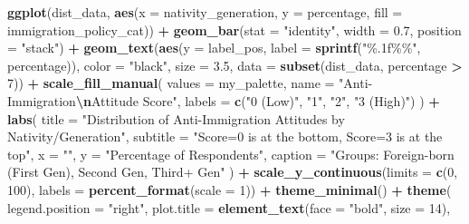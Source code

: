 \documentclass[
]{article}
\newenvironment{Shaded}{\begin{snugshade}}{\end{snugshade}}
\newcommand{\AttributeTok}[1]{\textcolor[rgb]{0.13,0.29,0.53}{#1}}
\newcommand{\DecValTok}[1]{\textcolor[rgb]{0.00,0.00,0.81}{#1}}
\newcommand{\FloatTok}[1]{\textcolor[rgb]{0.00,0.00,0.81}{#1}}
\newcommand{\FunctionTok}[1]{\textcolor[rgb]{0.13,0.29,0.53}{\textbf{#1}}}
\newcommand{\NormalTok}[1]{#1}
\newcommand{\SpecialCharTok}[1]{\textcolor[rgb]{0.81,0.36,0.00}{\textbf{#1}}}
\newcommand{\StringTok}[1]{\textcolor[rgb]{0.31,0.60,0.02}{#1}}
\begin{document}
\begin{Shaded}
\begin{Highlighting}[]
\FunctionTok{ggplot}\NormalTok{(dist\_data, }\FunctionTok{aes}\NormalTok{(}\AttributeTok{x =}\NormalTok{ nativity\_generation, }\AttributeTok{y =}\NormalTok{ percentage, }\AttributeTok{fill =}\NormalTok{ immigration\_policy\_cat)) }\SpecialCharTok{+}
  \FunctionTok{geom\_bar}\NormalTok{(}\AttributeTok{stat =} \StringTok{"identity"}\NormalTok{, }\AttributeTok{width =} \FloatTok{0.7}\NormalTok{, }\AttributeTok{position =} \StringTok{"stack"}\NormalTok{) }\SpecialCharTok{+}
  \FunctionTok{geom\_text}\NormalTok{(}\FunctionTok{aes}\NormalTok{(}\AttributeTok{y =}\NormalTok{ label\_pos, }\AttributeTok{label =} \FunctionTok{sprintf}\NormalTok{(}\StringTok{"\%.1f\%\%"}\NormalTok{, percentage)),}
            \AttributeTok{color =} \StringTok{"black"}\NormalTok{, }\AttributeTok{size =} \FloatTok{3.5}\NormalTok{,}
            \AttributeTok{data =} \FunctionTok{subset}\NormalTok{(dist\_data, percentage }\SpecialCharTok{\textgreater{}} \DecValTok{7}\NormalTok{)) }\SpecialCharTok{+}
  \FunctionTok{scale\_fill\_manual}\NormalTok{(}
    \AttributeTok{values =}\NormalTok{ my\_palette,}
    \AttributeTok{name =} \StringTok{"Anti{-}Immigration}\SpecialCharTok{\textbackslash{}n}\StringTok{Attitude Score"}\NormalTok{,}
    \AttributeTok{labels =} \FunctionTok{c}\NormalTok{(}\StringTok{"0 (Low)"}\NormalTok{, }\StringTok{"1"}\NormalTok{, }\StringTok{"2"}\NormalTok{, }\StringTok{"3 (High)"}\NormalTok{)}
\NormalTok{  ) }\SpecialCharTok{+}
  \FunctionTok{labs}\NormalTok{(}
    \AttributeTok{title =} \StringTok{"Distribution of Anti{-}Immigration Attitudes by Nativity/Generation"}\NormalTok{,}
    \AttributeTok{subtitle =} \StringTok{"Score=0 is at the bottom, Score=3 is at the top"}\NormalTok{,}
    \AttributeTok{x =} \StringTok{""}\NormalTok{,}
    \AttributeTok{y =} \StringTok{"Percentage of Respondents"}\NormalTok{,}
    \AttributeTok{caption =} \StringTok{"Groups: Foreign{-}born (First Gen), Second Gen, Third+ Gen"}
\NormalTok{  ) }\SpecialCharTok{+}
  \FunctionTok{scale\_y\_continuous}\NormalTok{(}\AttributeTok{limits =} \FunctionTok{c}\NormalTok{(}\DecValTok{0}\NormalTok{, }\DecValTok{100}\NormalTok{), }\AttributeTok{labels =} \FunctionTok{percent\_format}\NormalTok{(}\AttributeTok{scale =} \DecValTok{1}\NormalTok{)) }\SpecialCharTok{+}
  \FunctionTok{theme\_minimal}\NormalTok{() }\SpecialCharTok{+}
  \FunctionTok{theme}\NormalTok{(}
    \AttributeTok{legend.position =} \StringTok{"right"}\NormalTok{,}
    \AttributeTok{plot.title =} \FunctionTok{element\_text}\NormalTok{(}\AttributeTok{face =} \StringTok{"bold"}\NormalTok{, }\AttributeTok{size =} \DecValTok{14}\NormalTok{),}

\end{Highlighting}
\end{Shaded}
\end{document}
